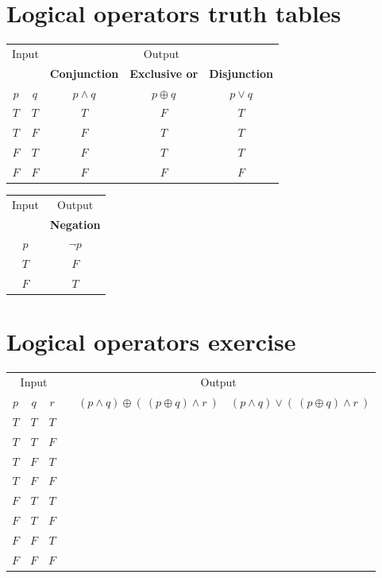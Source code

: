 \documentclass[12pt, oneside]{article}
\begin{document}
\section*{Logical operators truth tables}


\begin{center}
\begin{tabular}{cc||c|c|c}
\multicolumn{2}{c||}{Input}  & \multicolumn{3}{c}{Output} \\
& & {\bf Conjunction} &  {\bf Exclusive or} & {\bf Disjunction} \\
$p$ & $q$ & $p \land q$ &  $p  \oplus  q$ & $p \lor  q$ \\
\hline
$T$ & $T$ & $T$ & $F$ & $T$\\
$T$ & $F$ & $F$ & $T$ & $T$\\
$F$ & $T$ & $F$ & $T$ & $T$\\
$F$ & $F$ & $F$ & $F$ & $F$\\
\end{tabular}
\qquad \qquad\qquad
\begin{tabular}{c||c}
Input & Output \\
& {\bf Negation} \\
$p$ & $\lnot p$ \\
\hline
$T$ & $F$ \\
$F$ & $T$\\
\end{tabular}
\end{center}

\vfill \vfill
\section*{Logical operators exercise}


\begin{center}
    \begin{tabular}{ccc||p{3in}|c|c}
    \multicolumn{3}{c||}{Input}  & \multicolumn{3}{c}{Output} \\
    $p$ & $q$ & $r$  &  &  $(p \land q) \oplus (~ ( p \oplus q) \land r~)$ & $(p \land q) \vee (~ ( p \oplus q) \land r~)$ \\
    \hline
    $T$ & $T$  & $T$ &   && \\
    $T$ & $T$  & $F$ &   && \\
    $T$ & $F$  & $T$ &   && \\
    $T$ & $F$  & $F$ &   && \\
    $F$ & $T$  & $T$ &   && \\
    $F$ & $T$  & $F$ &   && \\
    $F$ & $F$  & $T$ &   && \\
    $F$ & $F$  & $F$ &   && \\
    \end{tabular}
\end{center}
    \vfill \vfill
\end{document}
